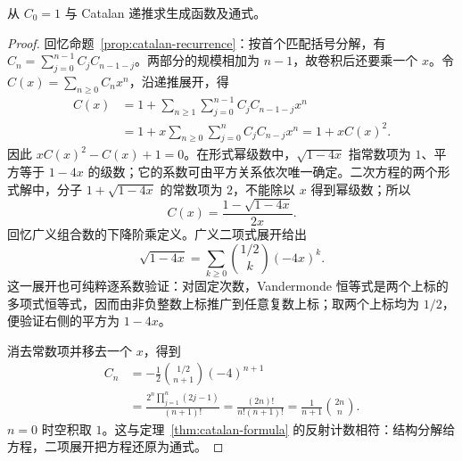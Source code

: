 \documentclass[lang=cn,a4paper,fontset=none,zihao=false,10pt,openany,twoside]{beautybook}
\numberwithin{algorithm}{chapter}
\begin{document}
\begin{example}\label{ex:catalan-gf}
从 $C_0=1$ 与 Catalan 递推求生成函数及通式。
\end{example}
\begin{proof}
回忆命题~\ref{prop:catalan-recurrence}：按首个匹配括号分解，有 $C_n=\sum_{j=0}^{n-1}C_jC_{n-1-j}$。两部分的规模相加为 $n-1$，故卷积后还要乘一个 $x$。令 $C(x)=\sum_{n\ge0}C_nx^n$，沿递推展开，得
\[
 \begin{aligned}
 C(x)
 &=1+\sum_{n\ge1}\sum_{j=0}^{n-1}C_jC_{n-1-j}x^n\\
 &=1+x\sum_{n\ge0}\sum_{j=0}^nC_jC_{n-j}x^n
 =1+xC(x)^2.
 \end{aligned}
\]
因此 $xC(x)^2-C(x)+1=0$。在形式幂级数中，$\sqrt{1-4x}$ 指常数项为 $1$、平方等于 $1-4x$ 的级数；它的系数可由平方关系依次唯一确定。二次方程的两个形式解中，分子 $1+\sqrt{1-4x}$ 的常数项为 $2$，不能除以 $x$ 得到幂级数；所以
\[
 C(x)=\frac{1-\sqrt{1-4x}}{2x}.
\]
回忆广义组合数的下降阶乘定义。广义二项式展开给出
\[
 \sqrt{1-4x}=\sum_{k\ge0}\binom{1/2}k(-4x)^k.
\]
这一展开也可纯粹逐系数验证：对固定次数，Vandermonde 恒等式是两个上标的多项式恒等式，因而由非负整数上标推广到任意复数上标；取两个上标均为 $1/2$，便验证右侧的平方为 $1-4x$。

消去常数项并移去一个 $x$，得到
\[
 \begin{aligned}
 C_n
 &=-\frac12\binom{1/2}{n+1}(-4)^{n+1}\\
 &=\frac{2^n\prod_{j=1}^n(2j-1)}{(n+1)!}
 =\frac{(2n)!}{n!(n+1)!}
 =\frac1{n+1}\binom{2n}n.
 \end{aligned}
\]
$n=0$ 时空积取 $1$。这与定理~\ref{thm:catalan-formula} 的反射计数相符：结构分解给方程，二项展开把方程还原为通式。
\end{proof}
\end{document}
